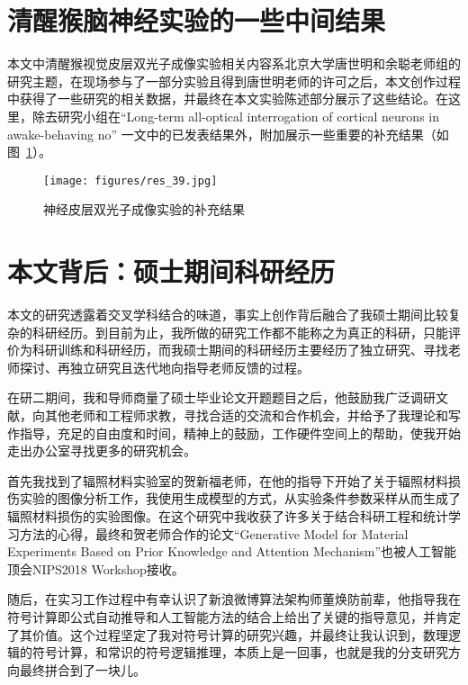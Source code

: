 \section{清醒猴脑神经实验的一些中间结果}
本文中清醒猴视觉皮层双光子成像实验相关内容系北京大学唐世明和余聪老师组的研究主题，在现场参与了一部分实验且得到唐世明老师的许可之后，本文创作过程中获得了一些研究的相关数据，并最终在本文实验陈述部分展示了这些结论。在这里，除去研究小组在“Long-term all-optical interrogation of cortical neurons in awake-behaving no” 一文中的已发表结果外，附加展示一些重要的补充结果（如图~\ref{fig:fig_39}）。

\begin{figure}[htb]
\centering
\texttt{[image: figures/res\_39.jpg]} 
\caption{神经皮层双光子成像实验的补充结果} \label{fig:fig_39}
\end{figure}


\section{本文背后：硕士期间科研经历}
本文的研究透露着交叉学科结合的味道，事实上创作背后融合了我硕士期间比较复杂的科研经历。到目前为止，我所做的研究工作都不能称之为真正的科研，只能评价为科研训练和科研经历，而我硕士期间的科研经历主要经历了独立研究、寻找老师探讨、再独立研究且迭代地向指导老师反馈的过程。

在研二期间，我和导师商量了硕士毕业论文开题题目之后，他鼓励我广泛调研文献，向其他老师和工程师求教，寻找合适的交流和合作机会，并给予了我理论和写作指导，充足的自由度和时间，精神上的鼓励，工作硬件空间上的帮助，使我开始走出办公室寻找更多的研究机会。

首先我找到了辐照材料实验室的贺新福老师，在他的指导下开始了关于辐照材料损伤实验的图像分析工作，我使用生成模型的方式，从实验条件参数采样从而生成了辐照材料损伤的实验图像。在这个研究中我收获了许多关于结合科研工程和统计学习方法的心得，最终和贺老师合作的论文“Generative Model for Material Experiments Based on Prior Knowledge and Attention Mechanism”也被人工智能顶会NIPS2018 Workshop接收。

随后，在实习工作过程中有幸认识了新浪微博算法架构师董焕防前辈，他指导我在符号计算即公式自动推导和人工智能方法的结合上给出了关键的指导意见，并肯定了其价值。这个过程坚定了我对符号计算的研究兴趣，并最终让我认识到，数理逻辑的符号计算，和常识的符号逻辑推理，本质上是一回事，也就是我的分支研究方向最终拼合到了一块儿。

